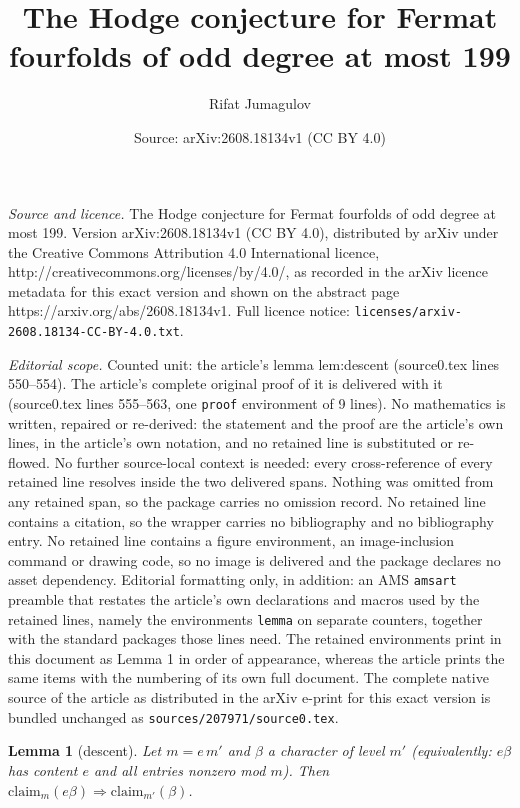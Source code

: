 \documentclass[10pt,a4paper]{amsart}
\title{The Hodge conjecture for Fermat fourfolds of odd degree at most 199}
\author{Rifat Jumagulov}
\date{Source: arXiv:2608.18134v1 (CC BY 4.0)}
\newtheorem{lemma}{Lemma}
\begin{document}
\maketitle

\noindent\emph{Source and licence.} The Hodge conjecture for Fermat fourfolds of odd degree at most 199. Version arXiv:2608.18134v1 (CC BY 4.0), distributed by arXiv under the Creative Commons Attribution 4.0 International licence, http://creativecommons.org/licenses/by/4.0/, as recorded in the arXiv licence metadata for this exact version and shown on the abstract page https://arxiv.org/abs/2608.18134v1. Full licence notice: \texttt{licenses/arxiv-2608.18134-CC-BY-4.0.txt}.\par\smallskip

\noindent\textit{Editorial scope.} Counted unit: the article's lemma lem:descent (source0.tex lines 550--554). The article's complete original proof of it is delivered with it (source0.tex lines 555--563, one \texttt{proof} environment of 9 lines). No mathematics is written, repaired or re-derived: the statement and the proof are the article's own lines, in the article's own notation, and no retained line is substituted or re-flowed.  No further source-local context is needed: every cross-reference of every retained line resolves inside the two delivered spans.  Nothing was omitted from any retained span, so the package carries no omission record.  No retained line contains a citation, so the wrapper carries no bibliography and no bibliography entry.  No retained line contains a figure environment, an image-inclusion command or drawing code, so no image is delivered and the package declares no asset dependency.  Editorial formatting only, in addition: an AMS \texttt{amsart} preamble that restates the article's own declarations and macros used by the retained lines, namely the environments \texttt{lemma} on separate counters, together with the standard packages those lines need.  The retained environments print in this document as Lemma 1 in order of appearance, whereas the article prints the same items with the numbering of its own full document.  The complete native source of the article as distributed in the arXiv e-print for this exact version is bundled unchanged as \texttt{sources/207971/source0.tex}.
\begin{lemma}[descent]\label{lem:descent}
Let $m=e\,m'$ and $\beta$ a character of level $m'$ (equivalently: $e\beta$ has content $e$
and all entries nonzero mod $m$). Then
$\mathrm{claim}_m(e\beta)\Rightarrow\mathrm{claim}_{m'}(\beta)$.
\end{lemma}
\end{document}
